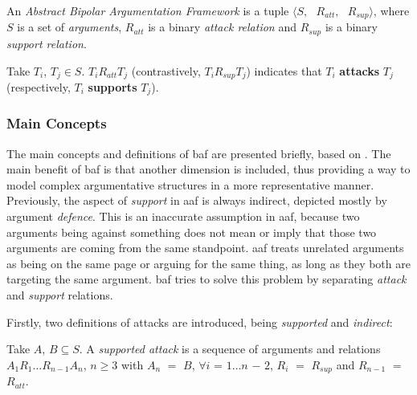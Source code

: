         \begin{definition}
            An \textit{Abstract Bipolar Argumentation Framework} is a tuple $\langle S, \text{ }R_{att}, \text{ }R_{sup} \rangle$, where $S$ is a set of \textit{arguments},  $R_{att}$ is a binary \textit{attack relation} and $R_{sup}$ is a binary \textit{support relation}.
            \label{definition:definition10}
        \end{definition}
        \begin{exa}
            Take $T_{i}$, $T_{j} \in S$. $T_{i}R_{att}T_{j}$ (contrastively, $T_{i}R_{sup}T_{j}$) indicates that $T_{i}$ \textbf{attacks} $T_{j}$ (respectively, $T_{i}$ \textbf{supports} $T_{j}$).
            \label{exa:example10}
        \end{exa}
        
        
        
        \subsubsection{Main Concepts}
            The main concepts and definitions of \gls{baf} are presented briefly, based on \autocite{Cayrol2005OnTA}. The main benefit of \gls{baf} is that another dimension is included, thus providing a way to model complex argumentative structures in a more representative manner. Previously, the aspect of \textit{support} in \gls{aaf} is always indirect, depicted mostly by argument \textit{defence}. This is an inaccurate assumption in \gls{aaf}, because two arguments being against something does not mean or imply that those two arguments are coming from the same standpoint. \gls{aaf} treats unrelated arguments as being on the same page or arguing for the same thing, as long as they both are targeting the same argument. \gls{baf} tries to solve this problem by separating \textit{attack} and \textit{support} relations.
            
            Firstly, two definitions of attacks are introduced, being \textit{supported} and \textit{indirect}:
            
            \begin{definition}
                Take $A$, $B \subseteq S$. A \textit{supported attack} is a sequence of arguments and relations $A_{1} R_{1} \ldots R_{n - 1} A_{n}$, $n \geq 3$ with $A_{n}$ $=$ $B$, $\forall i$ = $1 \ldots n$ $-$ $2$, $R_{i}$ $=$ $R_{sup}$ and $R_{n - 1}$ $=$ $R_{att}$.
                \label{definition:definition11}
            \end{definition}
            
